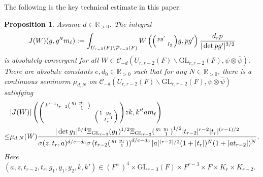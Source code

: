 \documentclass[12pt]{amsart}
\newtheorem{prop}[thm]{Proposition}
\theoremstyle{remark}
\numberwithin{equation}{section}
\newcommand{\GL}{\mathrm{GL}}
\newcommand{\RR}{\mathbb{R}}
\theoremstyle{definition}
\newenvironment{psmatrix}
  {\left(\begin{smallmatrix}}
  {\end{smallmatrix}\right)}
\numberwithin{equation}{subsection}
\begin{document}
The following is the key technical estimate in this paper: 
\begin{prop}
 \label{prop:J} 
Assume $d\in \RR_{>0}$. The integral 
    \begin{align}\label{eq:JW}
   J(W)(g,g'^tm_\ell):=\int_{U_{r-2}(F) \backslash \mathcal{P}_{r-2}(F)}W\left(\begin{psmatrix}pg' & \\ &  I_2 \end{psmatrix}g,pg'  \right)\frac{d_r p}{|\det pg'|^{3/2}}
    \end{align}
    is absolutely convergent for all $W \in \mathcal{C}_{-d}(U_{r,r-2}(F) \backslash \GL_{r,r-2}(F),\psi \otimes \overline{\psi}).$ There are absolute constants $e,d_0 \in \RR_{>0}$ such that for any $N \in \RR_{>0}$, there is a continuous seminorm $\mu_{d,N}$ on $ \mathcal{C}_{-d}(U_{r,r-2}(F) \backslash \GL_{r,r-2}(F),\psi \otimes \overline{\psi})$ satisfying
    \begin{align}
&|J(W)|\left(\begin{psmatrix}k'^{-1}t_{r-2}\begin{psmatrix} g_1 & y_1 & \\ & 1 \end{psmatrix} & \\ & &  \begin{psmatrix} 1  & y_2 \\ & t_r^{-1}\end{psmatrix}\end{psmatrix}zk, k'^tam_\ell\right) \label{J:eval} \\ \nonumber
    \leq &\mu_{d,N}(W)\frac{|\det g_1|^{5/4}\Xi_{\GL_{r-3}}(g_1)^{1/2}\Xi_{\GL_{r-2}}\begin{psmatrix}
        g_1 &y_1 \\
          & 1
    \end{psmatrix}^{1/2}|t_{r-2}|^{r-2}|t_r|^{(r-1)/2}}{\sigma(z,t_r,a)^{d/e-d_0}\sigma\left(t_{r-2}\begin{psmatrix}
        g_1 &y_1 \\
          & 1
    \end{psmatrix}\right)^{d/e-d_0}|a|^{(r-2)/2}(1+|t_r|)^{N}(1+|at_{r-2}|)^N}.
\end{align}   
Here $(a,z,t_{r-2},t_r,g_1,y_1,y_2,k,k') \in (F^\times)^4 \times \GL_{r-3}(F) \times F^{r-3} \times F \times K_r \times K_{r-2}.$
\end{prop}
\end{document}
